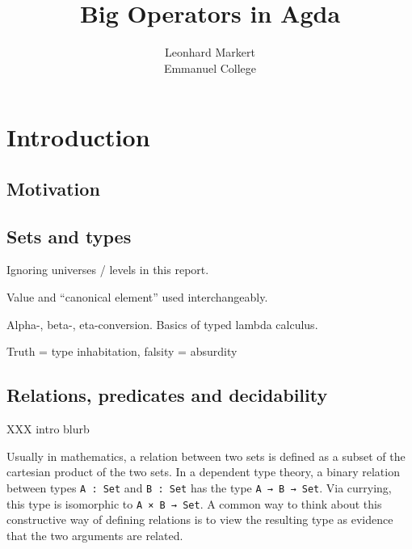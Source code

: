 

\title{Big Operators in Agda}
\author{Leonhard Markert \\ Emmanuel College}



\begin{titlepage}
\maketitle
\tableofcontents
\end{titlepage}

\chapter{Introduction}

\section{Motivation}

\section{Sets and types}

Ignoring universes / levels in this report.

Value and \enquote{canonical element} used interchangeably.

Alpha-, beta-, eta-conversion. Basics of typed lambda calculus.

Truth = type inhabitation, falsity = absurdity

\section{Relations, predicates and decidability}

XXX intro blurb


Usually in mathematics, a relation between two sets is defined as a subset of the cartesian product of the two sets. In a dependent type theory, a binary relation between types \texttt{A : Set} and \texttt{B : Set} has the type \texttt{A → B → Set}. Via currying, this type is isomorphic to \texttt{A × B → Set}. A common way to think about this constructive way of defining relations is to view the resulting type as evidence that the two arguments are related.


